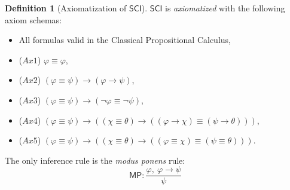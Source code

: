 \documentclass{article}
\theoremstyle{definition}
\newtheorem{definition}{Definition}[section]
\theoremstyle{definition}
\theoremstyle{definition}
\theoremstyle{definition}
\theoremstyle{definition}
\newcommand*{\id}{\equiv}
\newcommand*{\ra}{\rightarrow}
\newcommand{\SCI}{$\mathsf{SCI}$\xspace}
\begin{document}
\begin{definition}[Axiomatization of \SCI]
    \label{axiomatization}
    \SCI is \emph{axiomatized} with the following axiom schemas:
    \begin{itemize}
        \item All formulas valid in the Classical Propositional Calculus,
        \item ($Ax1$) $\varphi \id \varphi$,
        \item ($Ax2$) $(\varphi \id \psi) \ra (\varphi \ra \psi)$,
        \item ($Ax3$) $(\varphi \id \psi) \ra (\lnot \varphi \id \lnot \psi)$,
        \item ($Ax4$) $(\varphi \id \psi) \ra ((\chi \id \theta) \ra ((\varphi \ra \chi) \id (\psi \ra \theta)))$,
        \item ($Ax5$) $(\varphi \id \psi) \ra ((\chi \id \theta) \ra ((\varphi \id \chi) \id (\psi \id \theta)))$.
    \end{itemize}
    The only inference rule is the \emph{modus ponens} rule:
    $$
        \mathsf{MP}: \frac{
            \varphi, \ \varphi \ra \psi}%
        { \psi }
    $$
\end{definition}
\end{document}
